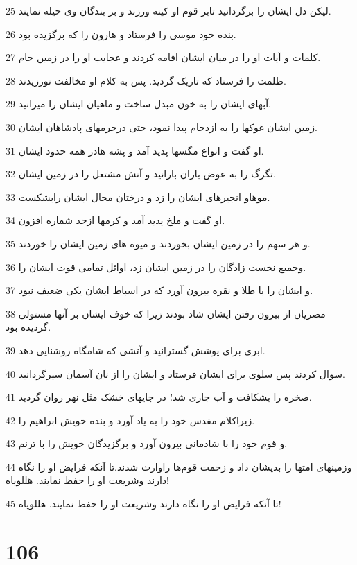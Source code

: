 \par 25 لیکن دل ایشان را برگردانید تابر قوم او کینه ورزند و بر بندگان وی حیله نمایند.
\par 26 بنده خود موسی را فرستاد و هارون را که برگزیده بود.
\par 27 کلمات و آیات او را در میان ایشان اقامه کردند و عجایب او را در زمین حام.
\par 28 ظلمت را فرستاد که تاریک گردید. پس به کلام او مخالفت نورزیدند.
\par 29 آبهای ایشان را به خون مبدل ساخت و ماهیان ایشان را میرانید.
\par 30 زمین ایشان غوکها را به ازدحام پیدا نمود، حتی درحرمهای پادشاهان ایشان.
\par 31 او گفت و انواع مگسها پدید آمد و پشه هادر همه حدود ایشان.
\par 32 تگرگ را به عوض باران بارانید و آتش مشتعل را در زمین ایشان.
\par 33 موهاو انجیرهای ایشان را زد و درختان محال ایشان رابشکست.
\par 34 او گفت و ملخ پدید آمد و کرمها ازحد شماره افزون.
\par 35 و هر سهم را در زمین ایشان بخوردند و میوه های زمین ایشان را خوردند.
\par 36 وجمیع نخست زادگان را در زمین ایشان زد، اوائل تمامی قوت ایشان را.
\par 37 و ایشان را با طلا و نقره بیرون آورد که در اسباط ایشان یکی ضعیف نبود.
\par 38 مصریان از بیرون رفتن ایشان شاد بودند زیرا که خوف ایشان بر آنها مستولی گردیده بود.
\par 39 ابری برای پوشش گسترانید و آتشی که شامگاه روشنایی دهد.
\par 40 سوال کردند پس سلوی برای ایشان فرستاد و ایشان را از نان آسمان سیرگردانید.
\par 41 صخره را بشکافت و آب جاری شد؛ در جایهای خشک مثل نهر روان گردید.
\par 42 زیراکلام مقدس خود را به یاد آورد و بنده خویش ابراهیم را.
\par 43 و قوم خود را با شادمانی بیرون آورد و برگزیدگان خویش را با ترنم.
\par 44 وزمینهای امتها را بدیشان داد و زحمت قوم‌ها راوارث شدند.تا آنکه فرایض او را نگاه دارند وشریعت او را حفظ نمایند. هللویاه!
\par 45 تا آنکه فرایض او را نگاه دارند وشریعت او را حفظ نمایند. هللویاه!
 
\chapter{106}

